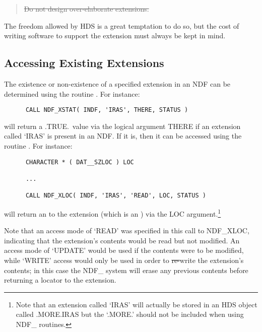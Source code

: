 \begin{quote}
\begin{center}
\st{Do not design over-elaborate extensions.}
\end{center}
\end{quote}

The freedom allowed by HDS is a great temptation to do so, but the cost of
writing software to support the extension must always be kept in mind. 

\subsection{\label{ss:accessingexistingextensions}Accessing Existing Extensions}

The existence or non-existence of a specified extension in an NDF can be
determined using the routine . 
For instance:

\small
\begin{verbatim}
      CALL NDF_XSTAT( INDF, 'IRAS', THERE, STATUS )
\end{verbatim}
\normalsize

will return a .TRUE.\ value via the logical argument THERE if an extension 
called `IRAS' is present in an NDF.
If it is, then it can be accessed using the routine .
For instance:

\small
\begin{verbatim}
      CHARACTER * ( DAT__SZLOC ) LOC

      ...

      CALL NDF_XLOC( INDF, 'IRAS', 'READ', LOC, STATUS )
\end{verbatim}
\normalsize

will return an  to the
extension (which is an ) via the
LOC argument.\footnote{Note that an extension called `IRAS' will
actually be stored in an HDS object called .MORE.IRAS but the `.MORE.'
should not be included when using NDF\_ routines.}

Note that an access mode of `READ' was specified in this call to NDF\_XLOC,
indicating that the extension's contents would be read but not modified. 
An access mode of `UPDATE' would be used if the contents were to be
modified, while `WRITE' access would only be used in order to \st{re-\/}write
the extension's contents; in this case the NDF\_ system will erase any
previous contents before returning a locator to the extension. 

